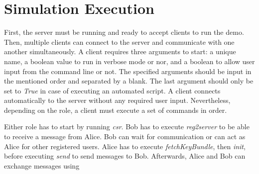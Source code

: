 \section{Simulation Execution}
First, the server must be running and ready to accept clients to run the demo. Then, multiple clients can connect to the server and communicate with one another simultaneously. A client requires three arguments to start: a unique name, a boolean value to run in verbose mode or nor, and a boolean to allow user input from the command line or not. The specified arguments should be input in the mentioned order and separated by a blank. The last argument should only be set to \textit{True} in case of executing an automated script. A client connects automatically to the server without any required user input. Nevertheless, depending on the role, a client must execute a set of commands in order.
\par
Either role has to start by running \textit{csr}. Bob has to execute \textit{reg2server} to be able to receive a message from Alice. Bob can wait for communication or can act as Alice for other registered users. Alice has to execute \textit{fetchKeyBundle}, then \textit{init}, before executing \textit{send} to send messages to Bob. Afterwards, Alice and Bob can exchange messages using 


